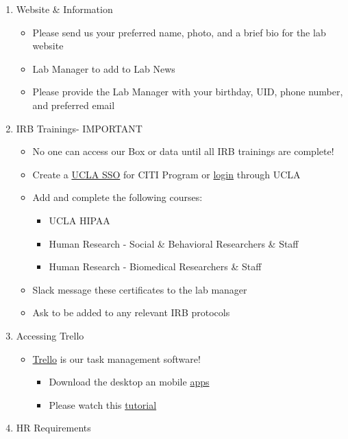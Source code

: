 \documentclass[]{book}
\providecommand{\tightlist}{%
  \setlength{\itemsep}{0pt}\setlength{\parskip}{0pt}}
\begin{document}
\begin{enumerate}
\def\labelenumi{\arabic{enumi}.}
\tightlist
\item
  Website \& Information

  \begin{itemize}
  \tightlist
  \item
    Please send us your preferred name, photo, and a brief bio for the lab website
  \item
    Lab Manager to add to Lab News
  \item
    Please provide the Lab Manager with your birthday, UID, phone number, and preferred email
  \end{itemize}
\item
  IRB Trainings- IMPORTANT

  \begin{itemize}
  \tightlist
  \item
    No one can access our Box or data until all IRB trainings are complete!
  \item
    Create a \href{https://ora.research.ucla.edu/OHRPP/Documents/Education/SSO_CITI_New_Acct.pdf}{UCLA SSO} for CITI Program or \href{https://www.research.ucla.edu/CITIProgram/}{login} through UCLA
  \item
    Add and complete the following courses:

    \begin{itemize}
    \tightlist
    \item
      UCLA HIPAA
    \item
      Human Research - Social \& Behavioral Researchers \& Staff
    \item
      Human Research - Biomedical Researchers \& Staff
    \end{itemize}
  \item
    Slack message these certificates to the lab manager
  \item
    Ask to be added to any relevant IRB protocols
  \end{itemize}
\item
  Accessing Trello

  \begin{itemize}
  \tightlist
  \item
    \href{https://trello.com}{Trello} is our task management software!

    \begin{itemize}
    \tightlist
    \item
      Download the desktop an mobile \href{https://trello.com/en-US/platforms}{apps}
    \item
      Please watch this \href{https://youtu.be/_Ry-SnJygy8}{tutorial}
    \end{itemize}
  \end{itemize}
\item
  HR Requirements


\end{enumerate}
\end{document}
